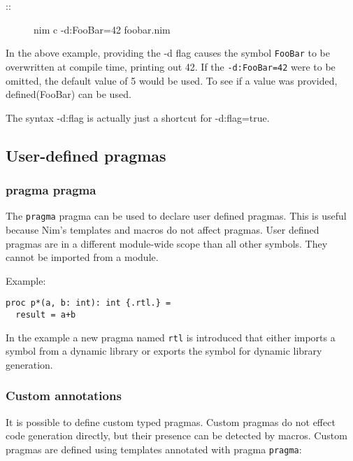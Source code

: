 \begin{verbatim}
\end{verbatim}

\begin{description}
\item[::]
nim c -d:FooBar=42 foobar.nim
\end{description}

In the above example, providing the -d flag causes the symbol
\texttt{FooBar} to be overwritten at compile time, printing out 42. If
the \texttt{-d:FooBar=42} were to be omitted, the default value of 5
would be used. To see if a value was provided, {defined(FooBar)} can be
used.

The syntax {-d:flag} is actually just a shortcut for {-d:flag=true}.

\hypertarget{user-defined-pragmas}{%
\subsection{User-defined pragmas}\label{user-defined-pragmas}}

\hypertarget{pragma-pragma}{%
\subsubsection{pragma pragma}\label{pragma-pragma}}

The \texttt{pragma} pragma can be used to declare user defined pragmas.
This is useful because Nim's templates and macros do not affect pragmas.
User defined pragmas are in a different module-wide scope than all other
symbols. They cannot be imported from a module.

Example:

\begin{verbatim}
proc p*(a, b: int): int {.rtl.} =
  result = a+b
\end{verbatim}

In the example a new pragma named \texttt{rtl} is introduced that either
imports a symbol from a dynamic library or exports the symbol for
dynamic library generation.

\hypertarget{custom-annotations}{%
\subsubsection{Custom annotations}\label{custom-annotations}}

It is possible to define custom typed pragmas. Custom pragmas do not
effect code generation directly, but their presence can be detected by
macros. Custom pragmas are defined using templates annotated with pragma
\texttt{pragma}:

